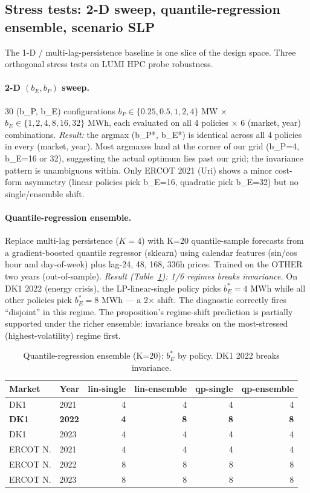 \documentclass[11pt]{article}
\begin{document}
\subsection{Stress tests: 2-D sweep, quantile-regression ensemble, scenario SLP}\label{sec:stress}

The 1-D / multi-lag-persistence baseline is one slice of the design
space. Three orthogonal stress tests on LUMI HPC probe robustness.

\paragraph{2-D $(b_E, b_P)$ sweep.} 30 (b_P, b_E) configurations
$b_P \in \{0.25, 0.5, 1, 2, 4\}$ MW $\times$ $b_E \in \{1, 2, 4, 8, 16, 32\}$
MWh, each evaluated on all 4 policies $\times$ 6 (market, year)
combinations. \emph{Result:} the argmax (b_P*, b_E*) is identical
across all 4 policies in every (market, year). Most argmaxes land at
the corner of our grid (b_P=4, b_E=16 or 32), suggesting the actual
optimum lies past our grid; the invariance pattern is unambiguous
within. Only ERCOT 2021 (Uri) shows a minor cost-form asymmetry
(linear policies pick b_E=16, quadratic pick b_E=32) but no
single/ensemble shift.

\paragraph{Quantile-regression ensemble.} Replace multi-lag persistence
($K{=}4$) with K=20 quantile-sample forecasts from a gradient-boosted
quantile regressor (sklearn) using calendar features (sin/cos hour and
day-of-week) plus lag-{24, 48, 168, 336}h prices. Trained on the OTHER
two years (out-of-sample). \emph{Result (Table~\ref{tab:quantile}):
1/6 regimes breaks invariance.} On DK1 2022 (energy crisis), the
LP-linear-single policy picks $b_E^* = 4$ MWh while all other policies
pick $b_E^* = 8$ MWh --- a 2$\times$ shift. The diagnostic correctly
fires ``disjoint'' in this regime. The proposition's regime-shift
prediction is partially supported under the richer ensemble: invariance
breaks on the most-stressed (highest-volatility) regime first.

\begin{table}[t]
\centering\small
\caption{\label{tab:quantile}Quantile-regression ensemble (K=20): $b_E^*$ by policy.
DK1 2022 breaks invariance.}
\begin{tabular}{llrrrr}
\toprule
Market & Year & lin-single & lin-ensemble & qp-single & qp-ensemble \\
\midrule
DK1 & 2021 & 4 & 4 & 4 & 4 \\
\textbf{DK1} & \textbf{2022} & \textbf{4} & \textbf{8} & \textbf{8} & \textbf{8} \\
DK1 & 2023 & 4 & 4 & 4 & 4 \\
ERCOT N. & 2021 & 4 & 4 & 4 & 4 \\
ERCOT N. & 2022 & 8 & 8 & 8 & 8 \\
ERCOT N. & 2023 & 8 & 8 & 8 & 8 \\
\bottomrule
\end{tabular}
\end{table}
\end{document}
